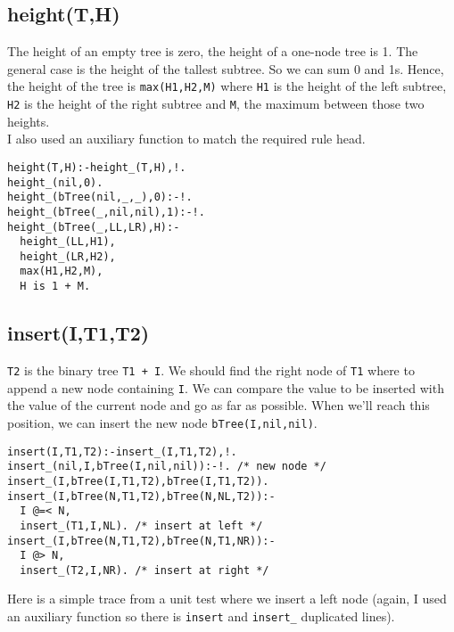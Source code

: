\documentclass{article}
\begin{document}
  \pagebreak

  \subsection*{height(T,H)}

    The height of an empty tree is zero, the height of a one-node tree is 1.
    The general case is the height of the tallest subtree. So we can sum 0 and 1s.
    Hence, the height of the tree is \texttt{max(H1,H2,M)} where
    \texttt{H1} is the height of the left subtree,
    \texttt{H2} is the height of the right subtree and
    \texttt{M}, the maximum between those two heights. \\
    I also used an auxiliary function to match the required rule head.

    \begin{verbatim}
height(T,H):-height_(T,H),!.
height_(nil,0).
height_(bTree(nil,_,_),0):-!.
height_(bTree(_,nil,nil),1):-!.
height_(bTree(_,LL,LR),H):-
  height_(LL,H1),
  height_(LR,H2),
  max(H1,H2,M),
  H is 1 + M.
    \end{verbatim}

  \subsection*{insert(I,T1,T2)}

    \texttt{T2} is the binary tree \texttt{T1 + I}.
    We should find the right node of \texttt{T1} where to append a
    new node containing \texttt{I}. We can compare the value to be
    inserted with the value of the current node and go as far as possible. When
    we'll reach this position, we can insert the new node \texttt{bTree(I,nil,nil)}.

    \begin{verbatim}
insert(I,T1,T2):-insert_(I,T1,T2),!.
insert_(nil,I,bTree(I,nil,nil)):-!. /* new node */
insert_(I,bTree(I,T1,T2),bTree(I,T1,T2)).
insert_(I,bTree(N,T1,T2),bTree(N,NL,T2)):-
  I @=< N,
  insert_(T1,I,NL). /* insert at left */
insert_(I,bTree(N,T1,T2),bTree(N,T1,NR)):-
  I @> N,
  insert_(T2,I,NR). /* insert at right */
    \end{verbatim}

    \pagebreak

    Here is a simple trace from a unit test where we insert a left node (again,
    I used an auxiliary function so there is \texttt{insert} and
    \texttt{insert_} duplicated lines).
\end{document}
